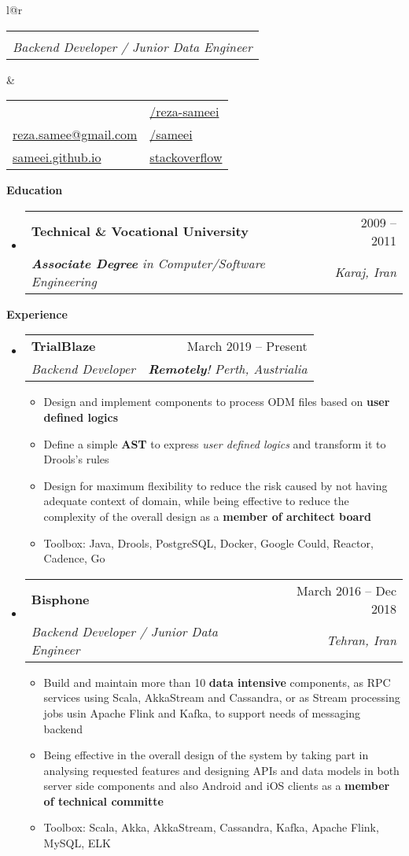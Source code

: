 \documentclass[letterpaper,12pt]{article}[leftmargin=*]
\makeatletter
\def \fullname {Reza Same'ei}
\def \subtitle {Backend Developer / Junior Data Engineer}
\def \linkedinicon {\faLinkedin}
\def \linkedinlink {http://linkedin.com/in/reza-sameei/}
\def \linkedintext {/reza-sameei}
\def \phoneicon {\faPhone}
\def \phonetext {+98-912-666-2695}
\def \emailicon {\faEnvelope}
\def \emaillink {mailto:reza.samee@gmail.com}
\def \emailtext {reza.samee@gmail.com}
\def \githubicon {\faGithub}
\def \githublink {https://github.com/sameei}
\def \githubtext {/sameei}
\def \stacksiteicon {\faGlobe}
\def \stacksitelink {https://stackoverflow.com/users/998642/reza-sameei}
\def \stacksitetext {stackoverflow}
\def \websiteicon {\faGlobe}
\def \websitelink {https://sameei.github.io/}
\def \websitetext {sameei.github.io}
\def \headertype {\doublecol} %
\def \entryspacing {-0pt}
\def \linkedin {\linkedinicon \hspace{3pt}\href{\linkedinlink}{\linkedintext}}
\def \phone {\phoneicon \hspace{3pt}{ \phonetext}}
\def \email {\emailicon \hspace{3pt}\href{\emaillink}{\emailtext}}
\def \github {\githubicon \hspace{3pt}\href{\githublink}{\githubtext}}
\def \stackoverflow {\stacksiteicon \hspace{3pt}\href{\stacksitelink}{\stacksitetext}}
\def \website {\websiteicon \hspace{3pt}\href{\websitelink}{\websitetext}}
\renewcommand{\section}[2]{\vspace{5pt}
  \colorbox{secondary}{\color{white}\raggedbottom\normalsize\textbf{{#1}{\hspace{7pt}#2}}}
}
\newcommand{\resumeEntryStart}{\begin{itemize}[leftmargin=2.5mm]}
\newcommand{\resumeEntryEnd}{\end{itemize}\vspace{\entryspacing}}
\newcommand{\resumeItemListStart}{\begin{itemize}[leftmargin=4.5mm]}
\newcommand{\resumeItemListEnd}{\end{itemize}}
\newcommand{\resumeItem}[1]{
  \item\small{
    {#1 \vspace{-2pt}}
  }
}
\newcommand{\resumeEntryTSDL}[4]{
  \vspace{-1pt}\item[]
    \begin{tabular*}{0.97\textwidth}{l@{\extracolsep{\fill}}r}
      \textbf{\color{primary}#1} & {\firabook\color{accent}\small#2} \\
      \textit{\color{accent}\small#3} & \textit{\color{accent}\small#4} \\
    \end{tabular*}\vspace{-6pt}
}
\newcommand{\doublecol}[6]{
  \begin{tabular*}{\textwidth}{l@{\extracolsep{\fill}}r}
    {
      \begin{tabular}[c]{l}
        \fontsize{35}{45}\selectfont{\color{primary}{{\textbf{\fullname}}}}
		\\
        {\textit{\subtitle}} %
      \end{tabular}
    } & {
      \begin{tabular}[c]{l@{\hspace{1.5em}}l}
        {\small#4} & {\small#1} \\
        {\small#5} & {\small#2} \\
        {\small#6} & {\small#3}
      \end{tabular}
    }
  \end{tabular*}
}
\newcommand{\singlecol}[6]{
  \begin{tabular*}{\textwidth}{l@{\extracolsep{\fill}}r}
    {
      \begin{tabular}[b]{l}
        \fontsize{35}{45}\selectfont{\color{primary}{{\textbf{\fullname}}}} \\
        {\textit{\subtitle}} %
      \end{tabular}
    } & {
      \begin{tabular}[c]{l}
        {\small#1} \\
        {\small#2} \\
        {\small#3} \\
        {\small#4} \\
        {\small#5} \\
        {\small#6}
      \end{tabular}
    }
  \end{tabular*}
}
\makeatother
\begin{document}


\headertype{\linkedin}{\github}{\stackoverflow}{\phone}{\email}{\website}{} %




\section{\faGraduationCap}{Education}

  \resumeEntryStart
    \resumeEntryTSDL
      {Technical \& Vocational University}{2009 -- 2011}
      {\textbf{Associate Degree} in Computer/Software Engineering}{Karaj, Iran}
  \resumeEntryEnd

\section{\faPieChart}{Experience}

  \resumeEntryStart
    \resumeEntryTSDL
      {TrialBlaze}{March 2019 -- Present}
      {Backend Developer}{\textbf{Remotely}! Perth, Austrialia}
    \resumeItemListStart
      \resumeItem {Design and implement components to process ODM files based on \textbf{user defined logics}}
      \resumeItem{Define a simple \textbf{AST} to express \textit{user defined logics} and transform it to Drools's rules}
      \resumeItem{Design for maximum flexibility to reduce the risk caused by not having adequate context of domain, while being effective to reduce the complexity of the overall design as a \textbf{member of architect board}}
      \resumeItem{Toolbox: Java, Drools, PostgreSQL, Docker, Google Could, Reactor, Cadence, Go}
    \resumeItemListEnd
  \resumeEntryEnd

  \resumeEntryStart
    \resumeEntryTSDL
      {Bisphone}{March 2016 -- Dec 2018}
      {Backend Developer / Junior Data Engineer}{Tehran, Iran}
    \resumeItemListStart
      \resumeItem{Build and maintain more than 10 \textbf{data intensive} components, as RPC services using Scala, AkkaStream and Cassandra, or as Stream processing jobs usin Apache Flink and Kafka, to support needs of messaging backend}
      \resumeItem{Being effective in the overall design of the system by taking part in analysing requested features and designing APIs and data models in both server side components and also Android and iOS clients as a \textbf{member of technical committe}}
      \resumeItem{Toolbox: Scala, Akka, AkkaStream, Cassandra, Kafka, Apache Flink, MySQL, ELK}
    \resumeItemListEnd
  \resumeEntryEnd
\end{document}
